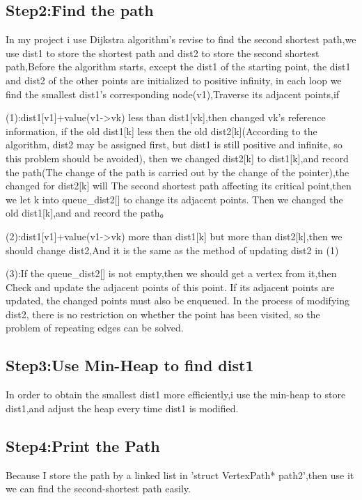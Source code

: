 \documentclass[12pt]{article}
\begin{document}
\subsection*{Step2:Find the path}
    In my project i use Dijkstra algorithm's revise to find the second shortest path,we use dist1
to store the shortest path and dist2 to store the second shortest path,Before the algorithm starts, except the dist1 of the starting point, the dist1 and dist2 of the other points are initialized to positive infinity,
in each loop we find the smallest dist1's corresponding node(v1),Traverse its adjacent points,if 

(1):dist1[v1]+value(v1->vk) less than dist1[vk],then changed vk's reference information,
if the old dist1[k] less then the old dist2[k](According to the algorithm, dist2 may be assigned first, but dist1 is still positive and infinite, so this problem should be avoided),
then we changed dist2[k] to dist1[k],and record the path(The change of the path is carried out by the change of the pointer),the changed for dist2[k] will The second shortest path affecting its critical point,then we let k into queue\_dist2[] to change its adjacent points. 
Then we changed the old dist1[k],and and record the path。

(2):dist1[v1]+value(v1->vk) more than dist1[k] but more than dist2[k],then we should change dist2,And it is the same as the method of updating dist2 in (1) 

(3):If the queue\_dist2[] is not empty,then we should get a vertex from it,then  Check and update the adjacent points of this point. If its adjacent points are updated, the changed points must also be enqueued.
In the process of modifying dist2, there is no restriction on whether the point has been visited, so the problem of repeating edges can be solved.

\subsection*{Step3:Use Min-Heap to find dist1}
In order to obtain the smallest dist1 more efficiently,i use the min-heap to store dist1,and adjust the heap every time dist1 is modified.

\subsection*{Step4:Print the Path}
    Because I store the path by a linked list in  'struct VertexPath* path2',then use it we can find the second-shortest path easily.
\end{document}
